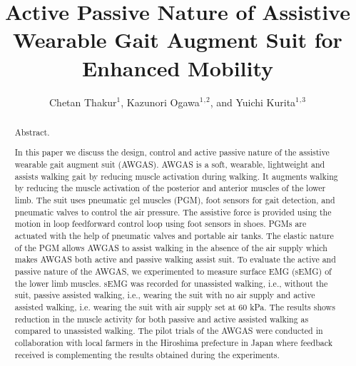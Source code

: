 \documentclass[paper,JRM,paper]{jaciiiarticle}
\begin{document}
\pagestyle{jaciiistyle}

\title{Active Passive Nature of Assistive Wearable Gait Augment Suit for Enhanced Mobility}

\author{Chetan Thakur$^1$, Kazunori Ogawa$^1$$^,$$^2$, and Yuichi Kurita$^1$$^,$$^3$}
\address{$^1$Hiroshima University, Hiroshima, Japan\\
		 $^2$ Daiya Industries Co, Ltd. Okayama, Japan\\
		 $^3$ JST PRESTO, Saitama, Japan\\
         E-mail: chetanthakur@hiroshima-u.ac.jp}
\maketitle

\begin{abstract}%
\noindent Abstract. %

In this paper we discuss the design, control and active passive nature of the assistive wearable gait augment suit (AWGAS).  AWGAS is a soft, wearable, lightweight and assists walking gait by reducing muscle activation during walking. It augments walking by reducing the muscle activation of the posterior and anterior muscles of the lower limb. The suit uses pneumatic gel muscles (PGM), foot sensors for gait detection, and pneumatic valves to control the air pressure. The assistive force is provided using the motion in loop feedforward control loop using  foot sensors in shoes. PGMs are actuated with the help of pneumatic valves and portable air tanks. The elastic nature of the PGM allows AWGAS to assist walking in the absence of the air supply which makes AWGAS both active and passive walking assist suit. To evaluate the active and passive nature of the AWGAS, we experimented to measure surface EMG (sEMG) of the lower limb muscles. sEMG was recorded for unassisted walking, i.e., without the suit, passive assisted walking, i.e., wearing the suit with no air supply and active assisted walking, i.e. wearing the suit with air supply set at 60 kPa.  The results shows reduction in the muscle activity for both passive and active assisted walking as compared to unassisted walking. The pilot trials of the AWGAS were conducted in collaboration with local farmers in the Hiroshima prefecture in Japan where feedback received is complementing the results obtained during the experiments.

\end{abstract}
\end{document}

